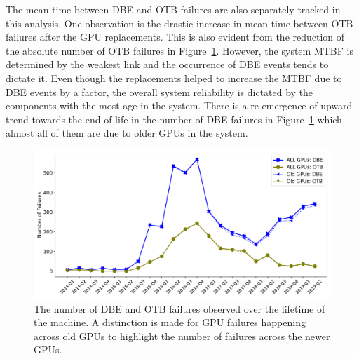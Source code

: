 The mean-time-between DBE and OTB failures are also separately tracked in this analysis.
One observation is the drastic increase in mean-time-between OTB failures after the GPU replacements.
This is also evident from the reduction of the absolute number of OTB failures in Figure~\ref{fig:NumFails_sys}.
However, the system MTBF is determined by the weakest link and the occurrence of DBE events tends to dictate it.
Even though the replacements helped to increase the MTBF due to DBE events by a factor, the overall system 
reliability is dictated by the components with the most age in the system. There is a re-emergence of upward trend towards 
the end of life in the number of DBE failures in Figure~\ref{fig:NumFails_sys} which almost all of them are due to 
older GPUs in the system. 
\begin{figure}[bt]
  \begin{center}
    \includegraphics[width=\columnwidth]{figs/NumFailures_Quarterly_newOld.pdf}
  \end{center}
  \caption{The number of DBE and OTB failures observed over the lifetime of the machine.
A distinction is made for GPU failures happening across old GPUs to highlight the number 
of failures across the newer GPUs.}
  \label{fig:NumFails_sys}
\end{figure}

